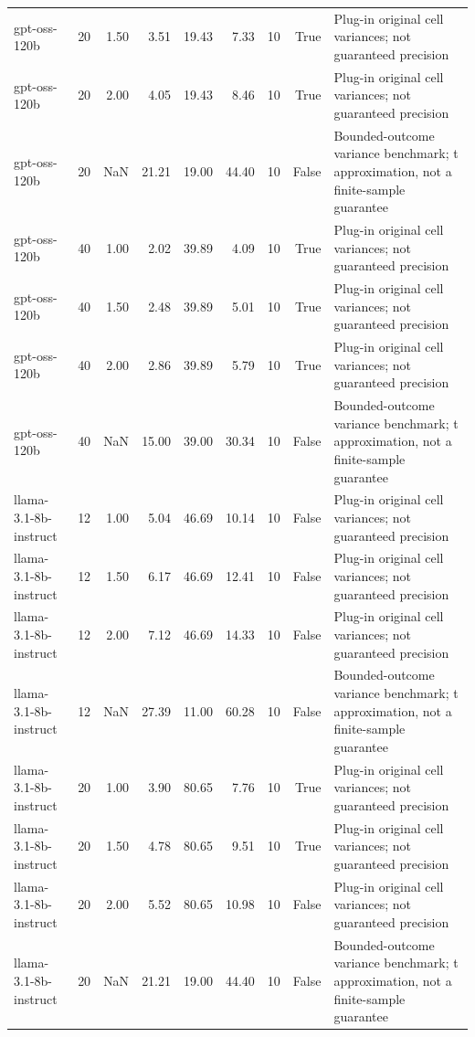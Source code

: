 \begin{tabular}{lrrrrrrrl}
gpt-oss-120b & 20 & 1.50 & 3.51 & 19.43 & 7.33 & 10 & True & Plug-in original cell variances; not guaranteed precision \\
gpt-oss-120b & 20 & 2.00 & 4.05 & 19.43 & 8.46 & 10 & True & Plug-in original cell variances; not guaranteed precision \\
gpt-oss-120b & 20 & NaN & 21.21 & 19.00 & 44.40 & 10 & False & Bounded-outcome variance benchmark; t approximation, not a finite-sample guarantee \\
gpt-oss-120b & 40 & 1.00 & 2.02 & 39.89 & 4.09 & 10 & True & Plug-in original cell variances; not guaranteed precision \\
gpt-oss-120b & 40 & 1.50 & 2.48 & 39.89 & 5.01 & 10 & True & Plug-in original cell variances; not guaranteed precision \\
gpt-oss-120b & 40 & 2.00 & 2.86 & 39.89 & 5.79 & 10 & True & Plug-in original cell variances; not guaranteed precision \\
gpt-oss-120b & 40 & NaN & 15.00 & 39.00 & 30.34 & 10 & False & Bounded-outcome variance benchmark; t approximation, not a finite-sample guarantee \\
llama-3.1-8b-instruct & 12 & 1.00 & 5.04 & 46.69 & 10.14 & 10 & False & Plug-in original cell variances; not guaranteed precision \\
llama-3.1-8b-instruct & 12 & 1.50 & 6.17 & 46.69 & 12.41 & 10 & False & Plug-in original cell variances; not guaranteed precision \\
llama-3.1-8b-instruct & 12 & 2.00 & 7.12 & 46.69 & 14.33 & 10 & False & Plug-in original cell variances; not guaranteed precision \\
llama-3.1-8b-instruct & 12 & NaN & 27.39 & 11.00 & 60.28 & 10 & False & Bounded-outcome variance benchmark; t approximation, not a finite-sample guarantee \\
llama-3.1-8b-instruct & 20 & 1.00 & 3.90 & 80.65 & 7.76 & 10 & True & Plug-in original cell variances; not guaranteed precision \\
llama-3.1-8b-instruct & 20 & 1.50 & 4.78 & 80.65 & 9.51 & 10 & True & Plug-in original cell variances; not guaranteed precision \\
llama-3.1-8b-instruct & 20 & 2.00 & 5.52 & 80.65 & 10.98 & 10 & False & Plug-in original cell variances; not guaranteed precision \\
llama-3.1-8b-instruct & 20 & NaN & 21.21 & 19.00 & 44.40 & 10 & False & Bounded-outcome variance benchmark; t approximation, not a finite-sample guarantee \\

\end{tabular}
